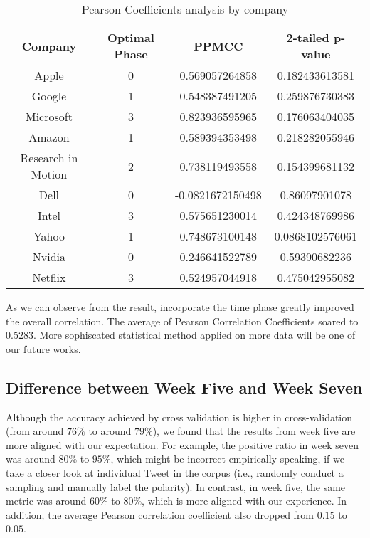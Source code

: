 \documentclass[12pt]{article}
\begin{document}
\begin{table}
\begin{center}
    \begin{tabular}{ | c || c | c | c | }
        \hline
        \textbf{Company} & \textbf{Optimal Phase} & \textbf{PPMCC} & \textbf{2-tailed p-value} \\ \hline
        \hline
        Apple & 0 & 0.569057264858 & 0.182433613581 \\ \hline
        Google & 1 & 0.548387491205 & 0.259876730383 \\ \hline
        Microsoft & 3 & 0.823936595965 & 0.176063404035 \\ \hline
        Amazon & 1 & 0.589394353498 & 0.218282055946 \\ \hline
        Research in Motion & 2 & 0.738119493558 & 0.154399681132 \\ \hline
        Dell & 0 & -0.0821672150498 & 0.86097901078 \\ \hline
        Intel & 3 & 0.575651230014 & 0.424348769986 \\ \hline
        Yahoo & 1 & 0.748673100148 & 0.0868102576061 \\ \hline
        Nvidia & 0 & 0.246641522789 & 0.59390682236 \\ \hline
        Netflix & 3 & 0.524957044918 & 0.475042955082 \\ \hline
    \end{tabular}
\caption{Pearson Coefficients analysis by company}
\label{optimal-phase}
\end{center}
\end{table}

As we can observe from the result, incorporate the time phase greatly improved the overall correlation. The average of Pearson Correlation Coefficients soared to $0.5283$. More sophiscated statistical method applied on more data will be one of our future works.

\subsection{Difference between Week Five and Week Seven}

Although the accuracy achieved by cross validation is higher in cross-validation (from around $76\%$ to around $79\%$), we found that the results from week five are more aligned with our expectation. For example, the positive ratio in week seven was around $80\%$ to $95\%$, which might be incorrect empirically speaking, if we take a closer look at individual Tweet in the corpus (i.e., randomly conduct a sampling and manually label the polarity). In contrast, in week five, the same metric was around $60\%$ to $80\%$, which is more aligned with our experience. In addition, the average Pearson correlation coefficient also dropped from $0.15$ to $0.05$.
\end{document}
